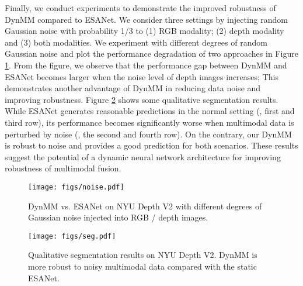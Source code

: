 Finally, we conduct experiments to demonstrate the improved robustness of DynMM compared to ESANet. We consider three settings by injecting random Gaussian noise with probability 1/3 to (1) RGB modality; (2) depth modality and (3) both modalities. We experiment with different degrees of random Gaussian noise and plot the performance degradation of two approaches in Figure \ref{fig.noise}. From the figure, we observe that the performance gap between DynMM and ESANet becomes larger when the noise level of depth images increases; This demonstrates another advantage of DynMM in reducing data noise and improving robustness. Figure \ref{fig.seg} shows some qualitative segmentation results. While ESANet generates reasonable predictions in the normal setting (\ie, first and third row), its performance becomes significantly worse when multimodal data is perturbed by noise (\ie, the second and fourth row). On the contrary, our DynMM is robust to noise and provides a good prediction for both scenarios. These results suggest the potential of a dynamic neural network architecture for improving robustness of multimodal fusion.

\begin{figure}[!t]
  \centering
  \texttt{[image: figs/noise.pdf]}
  \caption{DynMM vs. ESANet on NYU Depth V2 with different degrees of Gaussian noise injected into RGB / depth images. }
  \label{fig.noise}
\end{figure}

\begin{figure}[!t]
  \centering
  \texttt{[image: figs/seg.pdf]}
  \caption{Qualitative segmentation results on NYU Depth V2. DynMM is more robust to noisy multimodal data compared with the static ESANet.}
  \label{fig.seg}
\end{figure}






